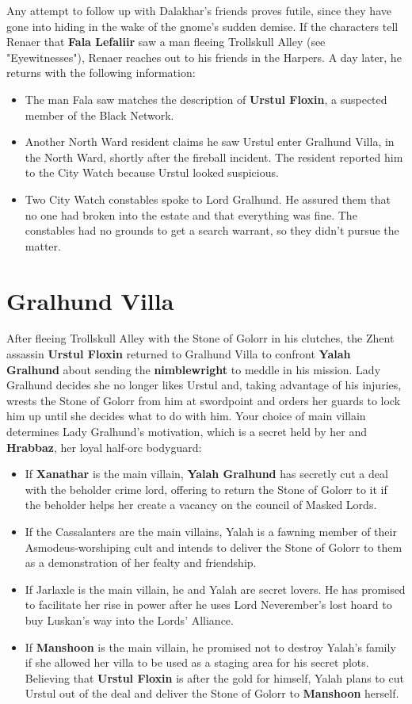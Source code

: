 \documentclass[10pt,a4paper,twoside,twocolumn,openany,nodeprecatedcode]{dndbook}
\begin{document}
Any attempt to follow up with Dalakhar's friends proves futile, since they have gone into hiding in the wake of the gnome's sudden demise.
If the characters tell Renaer that \textbf{Fala Lefaliir} saw a man fleeing Trollskull Alley (see "Eyewitnesses"), Renaer reaches out to his friends in the Harpers. A day later, he returns with the following information:
\begin{itemize}

\item The man Fala saw matches the description of \textbf{Urstul Floxin}, a suspected member of the Black Network.
\item Another North Ward resident claims he saw Urstul enter Gralhund Villa, in the North Ward, shortly after the fireball incident. The resident reported him to the City Watch because Urstul looked suspicious.
\item Two City Watch constables spoke to Lord Gralhund. He assured them that no one had broken into the estate and that everything was fine. The constables had no grounds to get a search warrant, so they didn't pursue the matter.
\end{itemize}


\section{Gralhund Villa}
After fleeing Trollskull Alley with the Stone of Golorr in his clutches, the Zhent assassin \textbf{Urstul Floxin} returned to Gralhund Villa to confront \textbf{Yalah Gralhund} about sending the \textbf{nimblewright} to meddle in his mission. Lady Gralhund decides she no longer likes Urstul and, taking advantage of his injuries, wrests the Stone of Golorr from him at swordpoint and orders her guards to lock him up until she decides what to do with him.
Your choice of main villain determines Lady Gralhund's motivation, which is a secret held by her and \textbf{Hrabbaz}, her loyal half-orc bodyguard:
\begin{itemize}

\item If \textbf{Xanathar} is the main villain, \textbf{Yalah Gralhund} has secretly cut a deal with the beholder crime lord, offering to return the Stone of Golorr to it if the beholder helps her create a vacancy on the council of Masked Lords.
\item If the Cassalanters are the main villains, Yalah is a fawning member of their Asmodeus-worshiping cult and intends to deliver the Stone of Golorr to them as a demonstration of her fealty and friendship.
\item If Jarlaxle is the main villain, he and Yalah are secret lovers. He has promised to facilitate her rise in power after he uses Lord Neverember's lost hoard to buy Luskan's way into the Lords' Alliance.
\item If \textbf{Manshoon} is the main villain, he promised not to destroy Yalah's family if she allowed her villa to be used as a staging area for his secret plots. Believing that \textbf{Urstul Floxin} is after the gold for himself, Yalah plans to cut Urstul out of the deal and deliver the Stone of Golorr to \textbf{Manshoon} herself.
\end{itemize}
\end{document}
